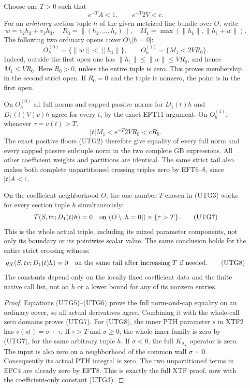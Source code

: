 Choose one $T>0$ such that
\[
                         e^{-T}A<1,\qquad e^{-T}2V<c.
 \tag{UTG3}
\]
For an \emph{arbitrary} section tuple $h$ of the given metrized
line bundle over $O$, write
\[
 w=v_2h_2+v_3h_3,\quad R_0=\|(h_2,\ldots,h_r)\|,
 \quad M_1=\max(\|h_1\|,\|h_1+w\|).
 \tag{UTG4}
\]
The following two ordinary opens cover $O\setminus|h=0|$:
\[
 O_h^{(0)}=\{\|w\|<\|h_1\|\},\qquad
 O_h^{(1)}=\{M_1<2VR_0\}.
 \tag{UTG5}
\]
Indeed, outside the first open one has
$\|h_1\|\le\|w\|\le VR_0$, and hence $M_1\le VR_0$.
Here $R_0>0$, unless the entire tuple is zero.  This proves
membership in the second strict open.  If $R_0=0$ and the
tuple is nonzero, the point is in the first open.

On $O_h^{(0)}$ all full norms and capped passive norms for
$D_1(t)h$ and $D_1(t)V(v)h$ agree for every $t$, by the exact
EFT11 argument.  On $O_h^{(1)}$, whenever $\tau=v(t)>T$,
\[
                         |t|M_1<e^{-T}2VR_0<cR_0.
 \tag{UTG6}
\]
The exact positive floors (UTG2) therefore give equality of
every full norm and every capped passive subtuple norm in
the two complete GB expressions.  All other coefficient
weights and partitions are identical.  The same strict tail
also makes both complete unpartitioned crossing triples zero
by EFT6--8, since $|t|A<1$.

\begin{theorem}
On the coefficient neighborhood $O$, the one number $T$ chosen
in (UTG3) works for every section tuple $h$ simultaneously:
\[
 \mathcal T(S,tv;D_1(t)h)=0
 \quad\hbox{on }(O\setminus|h=0|)\times\{\tau>T\}.
 \tag{UTG7}
\]
This is the whole actual triple, including its mixed parameter
components, not only its boundary or its pointwise scalar value.
The same conclusion holds for the entire strict crossing witness:
\[
 q_X(S,tv;D_1(t)h)=0
 \quad\hbox{on the same tail after increasing $T$ if needed.}
 \tag{UTG8}
\]
The constants depend only on the locally fixed coefficient data
and the finite native call list, not on $h$ or a lower bound for
any of its nonzero entries.
\end{theorem}

\begin{proof}
Equations (UTG5)--(UTG6) prove the full norm-and-cap equality
on an ordinary cover, so all actual derivatives agree.  Combining
it with the whole-call zero domains proves (UTG7).
For (UTG8), the inner PTH parameter $s$ in XTF2 has
$v(st)=\sigma+\tau$.  If $\tau>T$ and $\sigma\ge0$, the
whole inner family is zero by (UTG7), for the same arbitrary
tuple $h$.  If $\sigma<0$, the full $K_{\sigma_+}$ operator
is zero.  The input is also zero on a neighborhood of the
common wall $\sigma=0$.  Consequently its actual PTH integral
is zero.  The two unpartitioned terms in EFC4 are already zero
by EFT8.  This is exactly the full XTF proof, now with the
coefficient-only constant (UTG3).
\end{proof}

